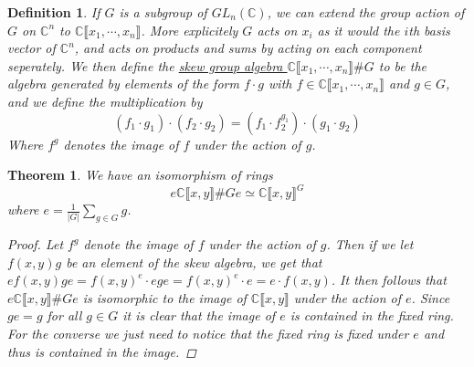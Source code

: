 \documentclass[11pt, a4paper, english]{article}
\numberwithin{prop}{section}
\numberwithin{lemma}{section}
\newtheorem{theorem}{Theorem}
\numberwithin{theorem}{section}
\newtheorem{defin}{Definition}
\numberwithin{defin}{section}
\numberwithin{example}{section}
\newcommand{\C}{\mathbb{C}}
\begin{document}
\begin{defin}
If $G$ is a subgroup of $GL_n(\C)$, we can extend the group action of $G$ on $\C^n$ to $\C\llbracket x_1, \cdots, x_n\rrbracket$. More explicitely $G$ acts on $x_i$ as it would the $i$th basis vector of $\C^n$, and acts on products and sums by acting on each component seperately. We then define the \underline{skew group algebra $\C \llbracket x_1, \cdots, x_n \rrbracket \# G$} to be the algebra generated by elements of the form $f \cdot g$ with $f \in \C\llbracket x_1, \cdots, x_n\rrbracket$ and $g \in G$, and we define the multiplication by
$$ (f_1 \cdot g_1) \cdot (f_2 \cdot g_2) = (f_1 \cdot f_2^{g_1}) \cdot (g_1 \cdot g_2) $$
Where $f^g$ denotes the image of $f$ under the action of $g$.
\end{defin}

\begin{theorem}
We have an isomorphism of rings
$$ e \C\llbracket x, y \rrbracket \# G e \simeq \C\llbracket x, y \rrbracket^G $$
where $e = \frac{1}{|G|} \sum_{g \in G} g$.

\begin{proof}
Let $f^g$ denote the image of $f$ under the action of $g$. Then if we let $f(x,y)g$ be an element of the skew algebra, we get that $e f(x,y)g e = f(x, y)^e \cdot ege = f(x, y)^e \cdot e = e \cdot f(x, y)$. It then follows that $  e \C\llbracket x, y\rrbracket \# G e$ is isomorphic to the image of $\C\llbracket x, y \rrbracket$ under the action of $e$. Since $ge=g$ for all $g\in G$ it is clear that the image of $e$ is contained in the fixed ring. For the converse we just need to notice that the fixed ring is fixed under $e$ and thus is contained in the image.
\end{proof}
\end{theorem}
\end{document}
